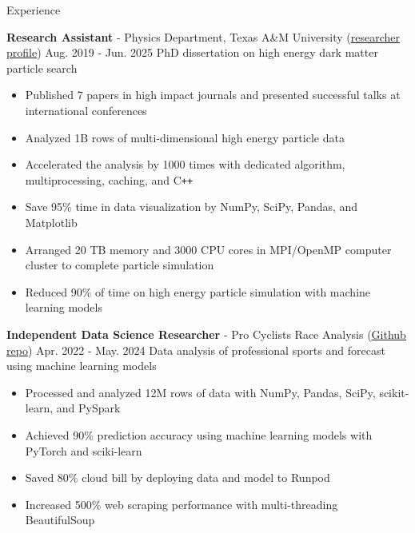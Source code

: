 \documentclass{resume}
\begin{document}
\begin{rSection}{Experience}
    \vspace{0.5em}
    \item \textbf{Research Assistant} - Physics Department, Texas A\&M University (\href{https://inspirehep.net/authors/2661451}{researcher profile}) \hfill Aug. 2019 - Jun. 2025
        \newline\hspace*{0.5em} {\normalsize PhD dissertation on high energy dark matter particle search}
        \begin{itemize}
        \item Published 7 papers in high impact journals and presented successful talks at international conferences
        \item Analyzed 1B rows of multi-dimensional high energy particle data
        \item Accelerated the analysis by 1000 times with dedicated algorithm, multiprocessing, caching, and C\texttt{++}
        \item Save 95\% time in data visualization by NumPy, SciPy, Pandas, and Matplotlib
        \item Arranged 20 TB memory and 3000 CPU cores in MPI/OpenMP computer cluster to complete particle simulation
        \item Reduced 90\% of time on high energy particle simulation with machine learning models
        \end{itemize}

    \vspace{0.5em}
    \item \textbf{Independent Data Science Researcher} - {Pro Cyclists Race Analysis} (\href{https://github.com/noctildon/pro_cyclists}{Github repo}) \hfill Apr. 2022 - May. 2024
        \newline\hspace*{0.5em} {\normalsize Data analysis of professional sports and forecast using machine learning models}
        \begin{itemize}
        \item Processed and analyzed 12M rows of data with NumPy, Pandas, SciPy, scikit-learn, and PySpark
        \item Achieved 90\% prediction accuracy using machine learning models with PyTorch and sciki-learn
        \item Saved 80\% cloud bill by deploying data and model to Runpod
        \item Increased 500\% web scraping performance with multi-threading BeautifulSoup
        \end{itemize}


\end{rSection}
\end{document}
